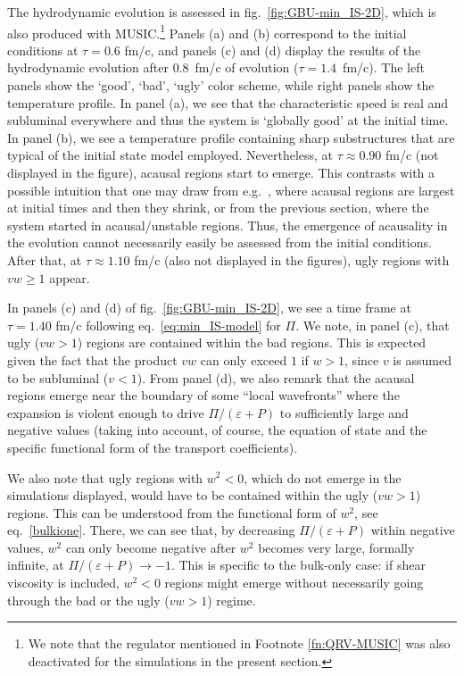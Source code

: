 \documentclass[aps, prd, showkeys,superscriptaddress, nofootinbib,floatfix]{revtex4-2}
\begin{document}
The hydrodynamic evolution is assessed in fig.~\ref{fig:GBU-min_IS-2D}, which is also produced with MUSIC.\footnote{We note that the regulator mentioned in Footnote \ref{fn:QRV-MUSIC} was also deactivated for the simulations in the present section.} 
Panels (a) and (b) correspond to the initial conditions at $\tau = 0.6$ fm/c, and panels (c) and (d) display the results of the hydrodynamic evolution after $0.8$~fm/c of evolution ($\tau=1.4$~fm/c). The left panels show the `good', `bad', `ugly' color scheme, while right panels show the temperature profile. In panel (a), we see that the characteristic speed is real and subluminal everywhere and thus the system is `globally good' at the initial time. In panel (b), we see a  temperature profile containing sharp substructures that are typical of the initial state model employed. Nevertheless, at $\tau \approx 0.90$ fm/c (not displayed in the figure), acausal regions start to emerge. This contrasts with a possible intuition that one may draw from e.g.~\cite{Plumberg:2021bme}, where acausal regions are largest at initial times and then they shrink, or from the previous section, where the system started in acausal/unstable regions. Thus, the emergence of acausality in the evolution cannot necessarily easily be assessed from the initial conditions. After that, at $\tau \approx 1.10$ fm/c (also not displayed in the figures), ugly regions with $v w \geq 1$ appear. 

In panels (c) and (d) of fig.~\ref{fig:GBU-min_IS-2D}, we see a time frame at $\tau = 1.40$ fm/c following eq.~\eqref{eq:min_IS-model} for $\Pi$. We note, in panel (c), that ugly ($vw>1$) regions are contained within the bad regions. This is expected given the fact that the product $vw$ can only exceed $1$ if $w > 1$, since $v$ is assumed to be subluminal ($v < 1$). From panel (d), we also remark that the acausal regions emerge near the boundary of some ``local wavefronts'' where the expansion is violent enough to drive $\Pi/(\varepsilon + P)$ to sufficiently large and negative values (taking into account, of course, the equation of state and the specific functional form of the transport coefficients). 

We also note that ugly regions with $w^{2}<0$, which do not emerge in the simulations displayed, would have to be contained within the ugly ($vw>1$) regions. This can be understood from the functional form of $w^{2}$, see eq.~\eqref{bulkione}. There, we can see that, by decreasing $\Pi/(\varepsilon + P)$ within negative values, $w^{2}$ can only become negative after $w^{2}$ becomes very large, formally infinite, at $\Pi/(\varepsilon + P) \to -1$. This is specific to the bulk-only case: if shear viscosity is included, $w^{2}<0$ regions might emerge without necessarily going through the bad or the ugly ($vw>1$) regime. 
\end{document}
